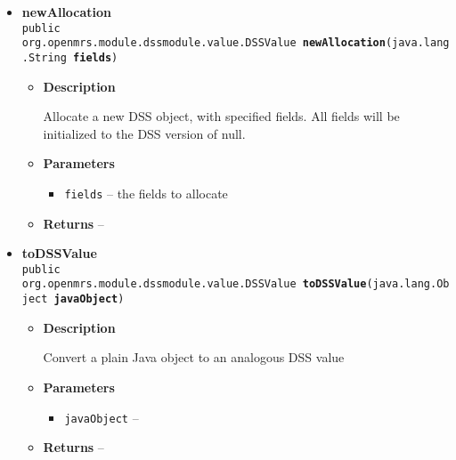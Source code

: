 {{{\begin{itemize}
{\begin{itemize}
{Evaluate a literal as a DSS value
}
\item{
{\bf  Parameters}
  \begin{itemize}
   \item{
\texttt{symbol} -- }
  \end{itemize}
}%
\item{{\bf  Returns} -- 
 
}%
\end{itemize}
}%
\item{ 
\hypertarget{org.openmrs.module.dssmodule.state.DSSEvaluator.newAllocation(java.lang.String[])}{{\bf  newAllocation}\\}
\texttt{public org.openmrs.module.dssmodule.value.DSSValue\ {\bf  newAllocation}(\texttt{java.lang.String\lbrack \rbrack } {\bf  fields})
\label{org.openmrs.module.dssmodule.state.DSSEvaluator.newAllocation(java.lang.String[])}}%
\begin{itemize}
\item{
{\bf  Description}

Allocate a new DSS object, with specified fields. All fields will be initialized to the DSS version of null.
}
\item{
{\bf  Parameters}
  \begin{itemize}
   \item{
\texttt{fields} -- the fields to allocate}
  \end{itemize}
}%
\item{{\bf  Returns} -- 
 
}%
\end{itemize}
}%
\item{ 
\hypertarget{org.openmrs.module.dssmodule.state.DSSEvaluator.toDSSValue(java.lang.Object)}{{\bf  toDSSValue}\\}
\texttt{public org.openmrs.module.dssmodule.value.DSSValue\ {\bf  toDSSValue}(\texttt{java.lang.Object} {\bf  javaObject})
\label{org.openmrs.module.dssmodule.state.DSSEvaluator.toDSSValue(java.lang.Object)}}%
\begin{itemize}
\item{
{\bf  Description}

Convert a plain Java object to an analogous DSS value
}
\item{
{\bf  Parameters}
  \begin{itemize}
   \item{
\texttt{javaObject} -- }
  \end{itemize}
}%
\item{{\bf  Returns} -- 
 
}
\end{itemize}}
\end{itemize}}}}
